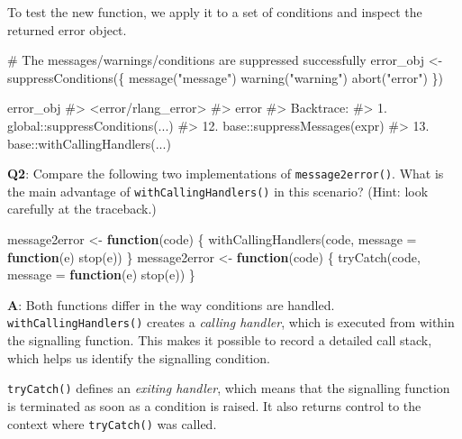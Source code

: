 \documentclass[
]{krantz}
\makeatletter
\newenvironment{Shaded}{\begin{snugshade}}{\end{snugshade}}
\newcommand{\CommentTok}[1]{\textcolor[rgb]{0.56,0.35,0.01}{\textit{#1}}}
\newcommand{\ControlFlowTok}[1]{\textcolor[rgb]{0.13,0.29,0.53}{\textbf{#1}}}
\newcommand{\DataTypeTok}[1]{\textcolor[rgb]{0.13,0.29,0.53}{#1}}
\newcommand{\KeywordTok}[1]{\textcolor[rgb]{0.13,0.29,0.53}{\textbf{#1}}}
\newcommand{\NormalTok}[1]{#1}
\newcommand{\StringTok}[1]{\textcolor[rgb]{0.31,0.60,0.02}{#1}}
\newenvironment{kframe}{%
\medskip{}
\setlength{\fboxsep}{.8em}
 \def\at@end@of@kframe{}%
 \ifinner\ifhmode%
  \def\at@end@of@kframe{\end{minipage}}%
  \begin{minipage}{\columnwidth}%
 \fi\fi%
 \def\FrameCommand##1{\hskip\@totalleftmargin \hskip-\fboxsep
 \colorbox{shadecolor}{##1}\hskip-\fboxsep
     \hskip-\linewidth \hskip-\@totalleftmargin \hskip\columnwidth}%
 \MakeFramed {\advance\hsize-\width
   \@totalleftmargin\z@ \linewidth\hsize
   \@setminipage}}%
 {\par\unskip\endMakeFramed%
 \at@end@of@kframe}
\renewenvironment{Shaded}{\begin{kframe}}{\end{kframe}}
\renewcommand{\KeywordTok} [1]{\textcolor[rgb]{0.00,0.44,0.13}{{#1}}}
\renewcommand{\DataTypeTok}[1]{\textcolor[rgb]{0.56,0.13,0.00}{{#1}}}
\renewcommand{\StringTok}  [1]{\textcolor[rgb]{0.25,0.44,0.63}{{#1}}}
\renewcommand{\CommentTok} [1]{\textcolor[rgb]{0.38,0.63,0.69}{{#1}}}
\renewcommand{\NormalTok}  [1]{{#1}}
\makeatother
\begin{document}
To test the new function, we apply it to a set of conditions and inspect the returned error object.

\begin{Shaded}
\begin{Highlighting}[]
\CommentTok{# The messages/warnings/conditions are suppressed successfully}
\NormalTok{error_obj <-}\StringTok{ }\KeywordTok{suppressConditions}\NormalTok{(\{}
  \KeywordTok{message}\NormalTok{(}\StringTok{"message"}\NormalTok{)}
  \KeywordTok{warning}\NormalTok{(}\StringTok{"warning"}\NormalTok{)}
  \KeywordTok{abort}\NormalTok{(}\StringTok{"error"}\NormalTok{)}
\NormalTok{\})}

\NormalTok{error_obj}
\CommentTok{#> <error/rlang_error>}
\CommentTok{#> error}
\CommentTok{#> Backtrace:}
\CommentTok{#>   1. global::suppressConditions(...)}
\CommentTok{#>  12. base::suppressMessages(expr)}
\CommentTok{#>  13. base::withCallingHandlers(...)}
\end{Highlighting}
\end{Shaded}

\textbf{{Q2}}: Compare the following two implementations of \texttt{message2error()}. What is the main advantage of \texttt{withCallingHandlers()} in this scenario? (Hint: look carefully at the traceback.)

\begin{Shaded}
\begin{Highlighting}[]
\NormalTok{message2error <-}\StringTok{ }\ControlFlowTok{function}\NormalTok{(code) \{}
  \KeywordTok{withCallingHandlers}\NormalTok{(code, }\DataTypeTok{message =} \ControlFlowTok{function}\NormalTok{(e) }\KeywordTok{stop}\NormalTok{(e))}
\NormalTok{\}}
\NormalTok{message2error <-}\StringTok{ }\ControlFlowTok{function}\NormalTok{(code) \{}
  \KeywordTok{tryCatch}\NormalTok{(code, }\DataTypeTok{message =} \ControlFlowTok{function}\NormalTok{(e) }\KeywordTok{stop}\NormalTok{(e))}
\NormalTok{\}}
\end{Highlighting}
\end{Shaded}

\textbf{{A}}: Both functions differ in the way conditions are handled. \texttt{withCallingHandlers()} creates a \emph{calling handler}, which is executed from within the signalling function. This makes it possible to record a detailed call stack, which helps us identify the signalling condition.

\texttt{tryCatch()} defines an \emph{exiting handler}, which means that the signalling function is terminated as soon as a condition is raised. It also returns control to the context where \texttt{tryCatch()} was called.
\end{document}

